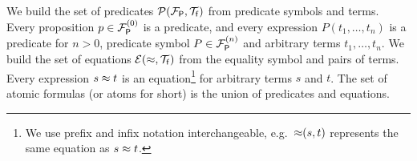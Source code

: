 
\begin{definition}\label{def:predicates}
	We build the set of {\myem predicates} $\mcPT$
	from predicate symbols and terms. 
	Every proposition $p\in \mcFPn[0]$ is a predicate, 
	and every expression $P(t_1,\ldots,t_n)$ is a predicate for $n>0$,
	predicate symbol $P\in\mcFPn$ and arbitrary terms $t_1,\ldots,t_n$.
%	
	We build the set of {\myem equations }$\mcET$ from the equality symbol and pairs of terms.
	Every expression $s\mEQ t$ is an equation\footnote{
		We use prefix and infix notation interchangeable, 
		e.g.~${\mEQ}(s,t)$ represents the same equation as $s\mEQ t$.} 
	for arbitrary terms $s$ and $t$.
%	
	The set of atomic formulas (or {\myem atoms }for short) is the union of predicates and equations.
\end{definition}